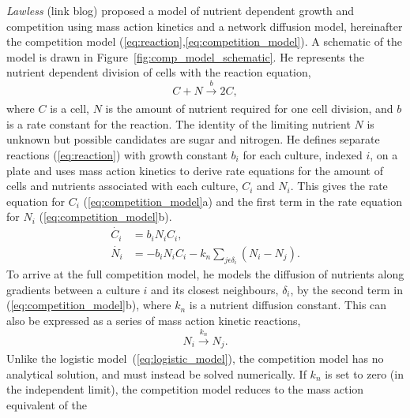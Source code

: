 \textit{Lawless} (link blog) proposed a model of nutrient dependent
growth and competition using mass action kinetics and a network
diffusion model, hereinafter the competition model
(\ref{eq:reaction},\ref{eq:competition_model}). A schematic of the
model is drawn in Figure~\ref{fig:comp_model_schematic}. He represents
the nutrient dependent division of cells with the reaction equation,
\begin{equation}
  \label{eq:reaction}
    C + N \xrightarrow[]{b} 2C,
\end{equation}
where \(C\) is a cell, \(N\) is the amount of nutrient required for
one cell division, and \(b\) is a rate constant for the reaction. The
identity of the limiting nutrient \(N\) is unknown but possible
candidates are sugar and nitrogen. He defines separate reactions
(\ref{eq:reaction}) with growth constant \(b_{i}\) for each culture,
indexed \(i\), on a plate and uses mass action kinetics to derive rate
equations for the amount of cells and nutrients associated with each
culture, \(C_{i}\) and \(N_{i}\). This gives the rate equation for
\(C_{i}\) (\ref{eq:competition_model}a) and the first term in the rate
equation for \(N_{i}\) (\ref{eq:competition_model}b).
\begin{subequations}
  \label{eq:competition_model}
  \begin{align}
    \dot{C_{i}}& = b_{i}N_{i}C_{i},\\
    \dot{N_{i}}& = - b_{i}N_{i}C_{i} - k_{n}\sum_{j \epsilon \delta_i}(N_{i} - N_{j}).
  \end{align}
\end{subequations}
To arrive at the full competition model, he models the diffusion of
nutrients along gradients between a culture \(i\) and its closest
neighbours, \(\delta_{i}\), by the second term in
(\ref{eq:competition_model}b), where \(k_{n}\) is a nutrient diffusion
constant. This can also be expressed as a series of mass action kinetic
reactions,
\begin{equation}
    N_{i} \xrightarrow[]{k_{n}} N_{j}.
  \label{eq:diffusion_reaction}
\end{equation}
Unlike the logistic model~(\ref{eq:logistic_model}), the competition
model has no analytical solution, and must instead be solved
numerically. If \(k_{n}\) is set to zero (in the independent limit),
the competition model reduces to the mass action equivalent of the

